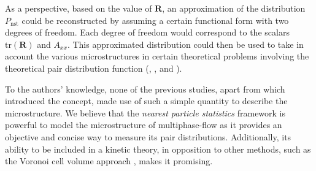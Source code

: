 As a perspective, based on the value of $\textbf{R}$, an approximation of the distribution $P_\text{nst}$ could be reconstructed by assuming a certain functional form with two degrees of freedom.
Each degree of freedom would correspond to the scalars $\text{tr}(\textbf{R})$ and $A_{xx}$.
This approximated distribution could then be used to take in account the various microstructures in certain theoretical problems involving the theoretical pair distribution function (\citet{batchelor1972sedimentation}, \citet{hinch1977averaged}, and \citet{zhang2021ensemble}).

To the authors' knowledge, none of the previous studies, apart from \citet{zhang2023evolution} which introduced the concept, made use of such a simple quantity to describe the microstructure. 
We believe that the \textit{nearest particle statistics} framework is powerful to model the microstructure of multiphase-flow as it provides an objective and concise way to measure its pair distributions. 
Additionally, its ability to be included in a kinetic theory, in opposition to other methods,  such as the Voronoi cell volume approach \citep{senthil2005voronoi}, makes it promising. 










